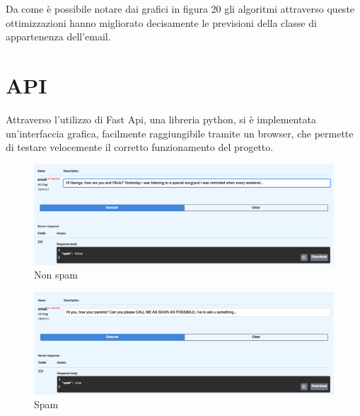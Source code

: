 \documentclass[12pt,a4paper]{article}
\begin{document}
Da come è possibile notare dai grafici in figura 20 gli algoritmi attraverso queste ottimizzazioni hanno migliorato decisamente le previsioni della classe di appartenenza dell'email.
\break
\begin{figure}[H]
    \centering
    \caption{}
\end{figure}


\section{API}
Attraverso l'utilizzo di Fast Api, una libreria python, si è implementata un'interfaccia grafica, facilmente raggiungibile tramite un browser, che permette di testare velocemente il corretto funzionamento del progetto.


\begin{figure}[h]
    \centering
    \includegraphics[width=1\columnwidth]{api_false.png}
    \caption{Non spam}
\end{figure}
\begin{figure}[h]
    \centering
    \includegraphics[width=1\columnwidth]{api_true.png}
    \caption{Spam}
\end{figure}
\end{document}
